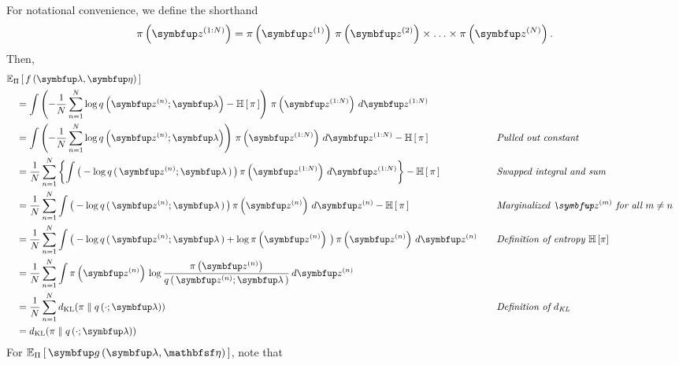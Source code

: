 \begin{proofEnd}
  For notational convenience, we define the shorthand
  \begin{align*}
    \pi\left(\vz^{(1:N)}\right) = \pi\left(\vz^{(1)}\right) \, \pi\left(\vz^{(2)}\right) \times \ldots \times \pi\left(\vz^{(N)}\right).
  \end{align*}
  Then,
  \begin{alignat}{2}
    &\Esub{\Pi}{ f\left(\vlambda, \veta\right) }
    \nonumber
    \\
    &\quad=
    \int \left(- \frac{1}{N} \sum^{N}_{n=1} \log q\left(\vz^{(n)}; \vlambda\right) - \mathbb{H}\left[\,\pi\,\right]\right) \, \pi\left(\vz^{(1:N)}\right) \, d\vz^{(1:N)}
    \nonumber
    \\
    &\quad=
    \int \left(- \frac{1}{N} \sum^{N}_{n=1} \log q\left(\vz^{(n)}; \vlambda\right)\right) \, \pi\left(\vz^{(1:N)}\right) \, d\vz^{(1:N)} - \mathbb{H}\left[\,\pi\,\right]
     &&\quad{\text{\textit{Pulled out constant}}}
    \nonumber
    \\
    &\quad=
     \frac{1}{N} \sum^{N}_{n=1} \left\{ \int \big(-\log q\,(\,\vz^{(n)}; \vlambda\,)\,\big) \, \pi\left(\vz^{(1:N)}\right) \, d\vz^{(1:N)} \right\} - \mathbb{H}\,[\,\pi\,] 
     &&\quad{\text{\textit{Swapped integral and sum}}}
    \nonumber
    \\
    &\quad=
    \frac{1}{N} \sum^{N}_{n=1} \int \big( -\log q\,(\,\vz^{(n)}; \vlambda\,) \,\big) \, \pi\left(\vz^{(n)}\right) \, d\vz^{(n)} - \mathbb{H}\,[\,\pi\,]
    &&\quad{\text{\textit{Marginalized \(\vz^{(m)}\) for all \(m \neq n\)}}}
    \nonumber
    \\
    &\quad=
    \frac{1}{N} \sum^{N}_{n=1} \int \big( -\log q\,(\,\vz^{(n)}; \vlambda\,) + \log\pi\left(\vz^{(n)}\right) \,\big) \, \pi\left(\vz^{(n)}\right) \, d\vz^{(n)}
    &&\quad{\text{\textit{Definition of entropy \(\mathbb{H}\left[\pi\right]\)}}}
    \nonumber
    \\
    &\quad=
    \frac{1}{N} \sum^{N}_{n=1} \int \pi\left(\vz^{(n)}\right) \, \log \frac{\pi\left(\vz^{(n)}\right)}{q\,(\,\vz^{(n)}; \vlambda\,)}  \, d\vz^{(n)}
    \nonumber
    \\
    &\quad=
    \frac{1}{N} \sum^{N}_{n=1} \DKL{\pi}{q\left(\cdot; \vlambda\right)}
    \nonumber
    &&\quad{\text{\textit{Definition of \(d_{\text{KL}}\)}}}
    \\
    &\quad=
    \DKL{\pi}{q\left(\cdot; \vlambda\right)}\label{eq:F_KL}
  \end{alignat}
  For \(\Esub{\Pi}{ \vg\left(\vlambda, \rvveta\right) }\), note that 

\end{proofEnd}
